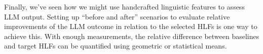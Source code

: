 \documentclass[a4paper,twoside]{article}
\begin{document}
Finally, we've seen how we might use handcrafted linguistic features to assess
LLM output.
Setting up ``before and after'' scenarios to evaluate relative improvements of
the LLM outcome in relation to the selected HLFs is one way to achieve this.
With enough measurements, the relative difference between baselines and target
HLFs can be quantified using geometric or statistical means.


{\small
}
\balance
\end{document}
